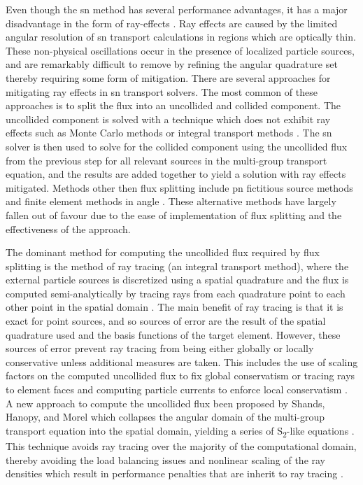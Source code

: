 Even though the \acrshort{sn} method has several performance advantages, it has a major disadvantage in the form of ray-effects \cite{computational_methods}. Ray effects are caused by the limited angular resolution of \acrshort{sn} transport calculations in regions which are optically thin. These non-physical oscillations occur in the presence of localized particle sources, and are remarkably difficult to remove by refining the angular quadrature set thereby requiring some form of mitigation. There are several approaches for mitigating ray effects in \acrshort{sn} transport solvers. The most common of these approaches is to split the flux into an uncollided and collided component. The uncollided component is solved with a technique which does not exhibit ray effects such as Monte Carlo methods \cite{denovo} or integral transport methods \cite{harbour_uncollided,fem_arbitrary_uncollided}. The \acrshort{sn} solver is then used to solve for the collided component using the uncollided flux from the previous step for all relevant sources in the multi-group transport equation, and the results are added together to yield a solution with ray effects mitigated. Methods other then flux splitting include \acrshort{pn} fictitious source methods \cite{anal_ray_effect_mitigation, 2D_ray_effect_mitigation} and finite element methods in angle \cite{anal_ray_effect_mitigation}. These alternative methods have largely fallen out of favour due to the ease of implementation of flux splitting and the effectiveness of the approach. 

The dominant method for computing the uncollided flux required by flux splitting is the method of ray tracing (an integral transport method), where the external particle sources is discretized using a spatial quadrature and the flux is computed semi-analytically by tracing rays from each quadrature point to each other point in the spatial domain \cite{harbour_uncollided,fem_arbitrary_uncollided}. The main benefit of ray tracing is that it is exact for point sources, and so sources of error are the result of the spatial quadrature used and the basis functions of the target element. However, these sources of error prevent ray tracing from being either globally or locally conservative unless additional measures are taken. This includes the use of scaling factors on the computed uncollided flux to fix global conservatism \cite{attila_uncollided} or tracing rays to element faces and computing particle currents to enforce local conservatism \cite{ardra_uncollided}. A new approach to compute the uncollided flux been proposed by Shands, Hanopy, and Morel which collapses the angular domain of the multi-group transport equation into the spatial domain, yielding a series of S\textsubscript{2}-like equations \cite{modified_sn}. This technique avoids ray tracing over the majority of the computational domain, thereby avoiding the load balancing issues and nonlinear scaling of the ray densities which result in performance penalties that are inherit to ray tracing \cite{fem_arbitrary_uncollided,modified_sn}. 

